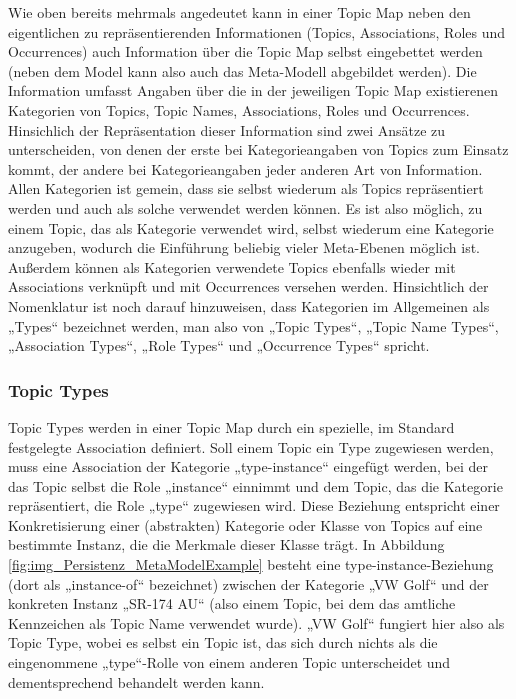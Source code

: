 Wie oben bereits mehrmals angedeutet kann in einer Topic Map neben den eigentlichen zu repräsentierenden Informationen (Topics, Associations, Roles und Occurrences) auch Information über die Topic Map selbst eingebettet werden (neben dem Model kann also auch das Meta-Modell abgebildet werden). Die Information umfasst Angaben über die in der jeweiligen Topic Map existierenen Kategorien von Topics, Topic Names, Associations, Roles und Occurrences. Hinsichlich der Repräsentation dieser Information sind zwei Ansätze zu unterscheiden, von denen der erste bei Kategorieangaben von Topics zum Einsatz kommt, der andere bei Kategorieangaben jeder anderen Art von Information. Allen Kategorien ist gemein, dass sie selbst wiederum als Topics repräsentiert werden und auch als solche verwendet werden können. Es ist also möglich, zu einem Topic, das als Kategorie verwendet wird, selbst wiederum eine Kategorie anzugeben, wodurch die Einführung beliebig vieler Meta-Ebenen möglich ist. Außerdem können als Kategorien verwendete Topics ebenfalls wieder mit Associations verknüpft und mit Occurrences versehen werden. Hinsichtlich der Nomenklatur ist noch darauf hinzuweisen, dass Kategorien im Allgemeinen als „Types“ bezeichnet werden, man also von „Topic Types“, „Topic Name Types“, „Association Types“, „Role Types“ und „Occurrence Types“ spricht.

\subsubsection{Topic Types}

Topic Types werden in einer Topic Map durch ein spezielle, im Standard festgelegte Association definiert. Soll einem Topic ein Type zugewiesen werden, muss eine Association der Kategorie „type-instance“ eingefügt werden, bei der das Topic selbst die Role „instance“ einnimmt und dem Topic, das die Kategorie repräsentiert, die Role „type“ zugewiesen wird. Diese Beziehung entspricht einer Konkretisierung einer (abstrakten) Kategorie oder Klasse von Topics auf eine bestimmte Instanz, die die Merkmale dieser Klasse trägt. In Abbildung \ref{fig:img_Persistenz_MetaModelExample} besteht eine type-instance-Beziehung (dort als „instance-of“ bezeichnet) zwischen der Kategorie „VW Golf“ und der konkreten Instanz „SR-174 AU“ (also einem Topic, bei dem das amtliche Kennzeichen als Topic Name verwendet wurde). „VW Golf“ fungiert hier also als Topic Type, wobei es selbst ein Topic ist, das sich durch nichts als die eingenommene „type“-Rolle von einem anderen Topic unterscheidet und dementsprechend behandelt werden kann.

